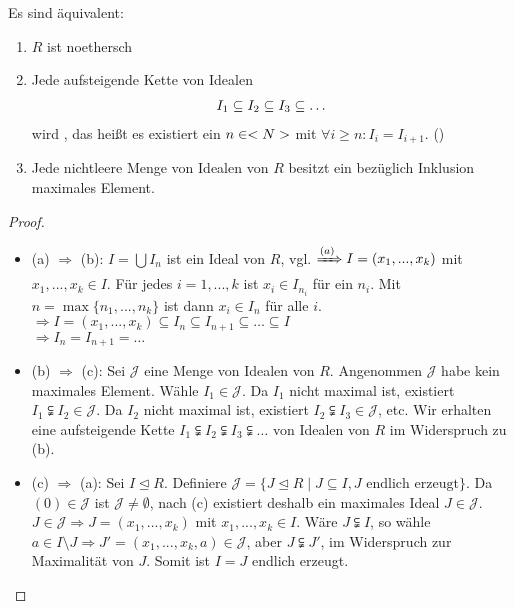 \begin{proposition}
	Es sind äquivalent:
	\begin{enumerate}[label=(\alph*)]
		\item $R$ ist noethersch
		\item Jede aufsteigende Kette von Idealen
		\begin{align}
			I_1 \subseteq I_2 \subseteq I_3 \subseteq\dots\notag
		\end{align}
		wird , das heißt es existiert ein $n\in<N>$ mit $\forall i\ge n: I_i=I_{i+1}$. ()
		\item Jede nichtleere Menge von Idealen von $R$ besitzt ein bezüglich Inklusion maximales Element.
	\end{enumerate}
\end{proposition}
\begin{proof}
	\begin{itemize}
		\item (a) $\Rightarrow$ (b): $I=\bigcup I_n$ ist ein Ideal von $R$, vgl.  $\xRightarrow{(a)} I = (x_1,...,x_k)$ mit $x_1,...,x_k\in I$. Für jedes $i=1,...,k$ ist $x_i\in I_{n_i}$ für ein $n_i$. Mit $n=\max\{n_1,...,n_k\}$ ist dann $x_i\in I_n$ für alle $i$. \\
		$\Rightarrow I = (x_1,...,x_k) \subseteq I_n \subseteq I_{n+1}\subseteq \dots\subseteq I$ \\
		$\Rightarrow I_n = I_{n+1} = \dots$
		\item (b) $\Rightarrow$ (c): Sei $\mathcal{J}$ eine Menge von Idealen von $R$. Angenommen $\mathcal{J}$ habe kein maximales Element. Wähle $I_1\in\mathcal{J}$. Da $I_1$ nicht maximal ist, existiert $I_1\subsetneqq I_2\in\mathcal{J}$. Da $I_2$ nicht maximal ist, existiert $I_2\subsetneqq I_3\in\mathcal{J}$, etc. Wir erhalten eine aufsteigende Kette $I_1\subsetneqq I_2\subsetneqq I_3\subsetneqq\dots$ von Idealen von $R$ im Widerspruch zu (b).
		\item (c) $\Rightarrow$ (a): Sei $I\unlhd R$. Definiere $\mathcal{J} = \{J\unlhd R\mid J\subseteq I, J\text{ endlich erzeugt}\}$. Da $(0)\in\mathcal{J}$ ist $\mathcal{J}\neq \emptyset$, nach (c) existiert deshalb ein maximales Ideal $J\in\mathcal{J}$. $J\in\mathcal{J}\Rightarrow J=(x_1,...,x_k)$ mit $x_1,...,x_k\in I$. Wäre $J\subsetneqq I$, so wähle $a\in I\setminus J\Rightarrow J'=(x_1,...,x_k,a)\in\mathcal{J}$, aber $J\subsetneqq J'$, im Widerspruch zur Maximalität von $J$. Somit ist $I=J$ endlich erzeugt.
	\end{itemize}
\end{proof}

